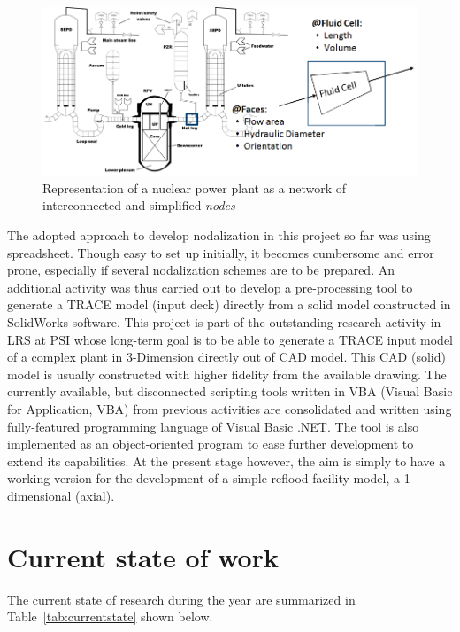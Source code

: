 \documentclass[11pt,titlepage]{article}
\begin{document}
\begin{figure}[h!]
	\centering
	\includegraphics[scale=0.65]{figures/nodalization.png}
	\caption{Representation of a nuclear power plant as a network of interconnected and simplified \emph{nodes}}
	\label{fig:nodalization}
\end{figure}

The adopted approach to develop nodalization in this project so far was using spreadsheet. 
Though easy to set up initially, it becomes cumbersome and error prone, especially if several nodalization schemes are to be prepared.
An additional activity was thus carried out to develop a pre-processing tool to generate a TRACE model (input deck) directly from a solid model constructed in SolidWorks software.
This project is part of the outstanding research activity in LRS at PSI whose long-term goal is to be able to generate a TRACE input model of a complex plant in 3-Dimension directly out of CAD model.
This CAD (solid) model is usually constructed with higher fidelity from the available drawing.
The currently available, but disconnected scripting tools written in VBA (Visual Basic for Application, VBA) from previous activities are consolidated and written using fully-featured programming language of Visual Basic .NET.
The tool is also implemented as an object-oriented program to ease further development to extend its capabilities.
At the present stage however, the aim is simply to have a working version for the development of a simple reflood facility model, a 1-dimensional (axial).

\section{Current state of work}

The current state of research during the year are summarized in 
Table~\ref{tab:currentstate} shown below.
\end{document}
